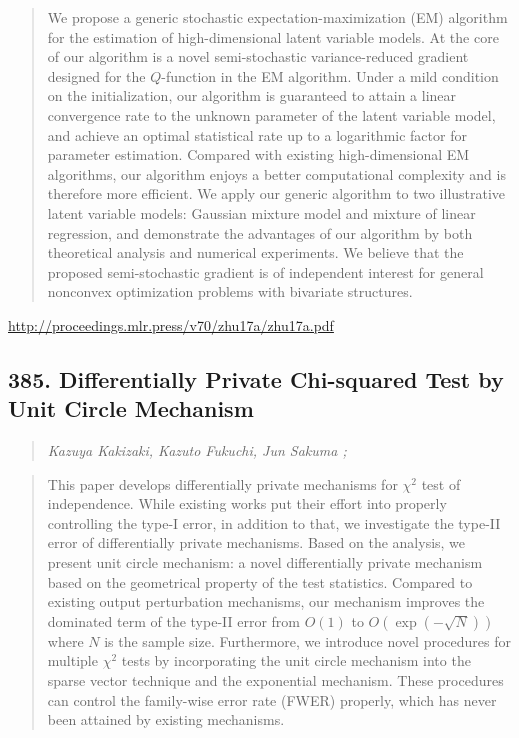 \documentclass{article}
\begin{document}
\begin{quote}
    We propose a generic stochastic expectation-maximization (EM) algorithm for the estimation of high-dimensional latent variable models. At the core of our algorithm is a novel semi-stochastic variance-reduced gradient designed for the $Q$-function in the EM algorithm. Under a mild condition on the initialization, our algorithm is guaranteed to attain a linear convergence rate to the unknown parameter of the latent variable model, and achieve an optimal statistical rate up to a logarithmic factor for parameter estimation. Compared with existing high-dimensional EM algorithms, our algorithm enjoys a better computational complexity and is therefore more efficient. We apply our generic algorithm to two illustrative latent variable models: Gaussian mixture model and mixture of linear regression, and demonstrate the advantages of our algorithm by both theoretical analysis and numerical experiments. We believe that the proposed semi-stochastic gradient is of independent interest for general nonconvex optimization problems with bivariate structures.  
\end{quote}

\href{http://proceedings.mlr.press/v70/zhu17a/zhu17a.pdf}{http://proceedings.mlr.press/v70/zhu17a/zhu17a.pdf}

\subsection{385. Differentially Private Chi-squared Test by Unit Circle Mechanism}

\begin{quote}
\footnotesize{\textit{Kazuya Kakizaki, Kazuto Fukuchi, Jun Sakuma ;}}

\end{quote}

\begin{quote}
    This paper develops differentially private mechanisms for $\chi^2$ test of independence. While existing works put their effort into properly controlling the type-I error, in addition to that, we investigate the type-II error of differentially private mechanisms. Based on the analysis, we present unit circle mechanism: a novel differentially private mechanism based on the geometrical property of the test statistics. Compared to existing output perturbation mechanisms, our mechanism improves the dominated term of the type-II error from $O(1)$ to $O(\exp(-\sqrt{N}))$ where $N$ is the sample size. Furthermore, we introduce novel procedures for multiple $\chi^2$ tests by incorporating the unit circle mechanism into the sparse vector technique and the exponential mechanism. These procedures can control the family-wise error rate (FWER) properly, which has never been attained by existing mechanisms.  
\end{quote}
\end{document}
